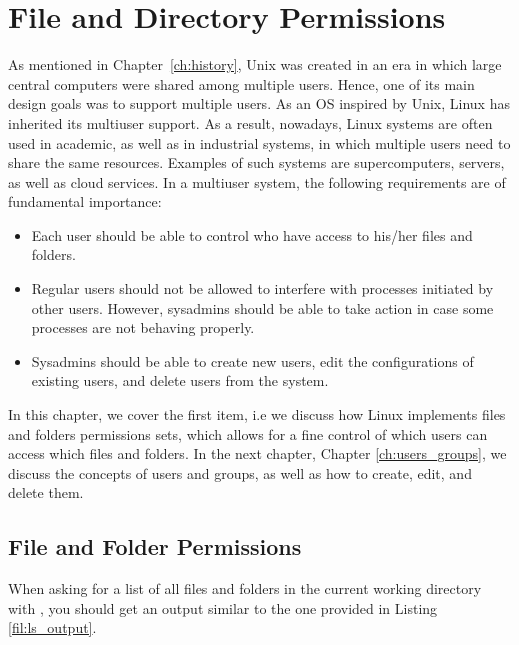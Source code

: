 \chapter{File and Directory Permissions}\label{ch:permissions}

As mentioned in Chapter~\ref{ch:history}, Unix was created in an era in which large central computers were shared among multiple users. Hence, one of its main design goals was to support multiple users. As an \ac{OS} inspired by Unix, Linux has inherited its multiuser support. As a result, nowadays, Linux systems are often used in academic, as well as in industrial systems, in which multiple users need to share the same resources. Examples of such systems are supercomputers, servers, as well as cloud services. In a multiuser system, the following requirements are of fundamental importance: 

\begin{itemize}
\item Each user should be able to control who have access to his/her files and folders.
\item Regular users should not be allowed to interfere with processes initiated by other users. However, sysadmins should be able to take action in case some processes are not behaving properly.
\item Sysadmins should be able to create new users, edit the configurations of existing users, and delete users from the system.
\end{itemize}

In this chapter, we cover the first item, i.e we discuss how Linux implements files and folders permissions sets, which allows for a fine control of which users can access which files and folders. In the next chapter, Chapter \ref{ch:users_groups}, we discuss the concepts of users and groups, as well as how to create, edit, and delete them.

\section{File and Folder Permissions}

When asking for a list of all files and folders in the current working directory with , you should get an output similar to the one provided in Listing \ref{fil:ls_output}.


